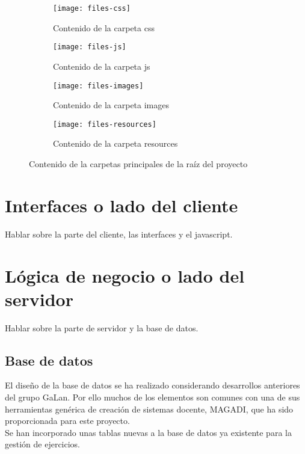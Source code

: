 \begin{figure}[h]
\begin{subfigure}[b]{0.5\textwidth}
	\texttt{[image: files-css]}
	\caption{Contenido de la carpeta css}
	\label{fig:files-css}
\end{subfigure}
%
\begin{subfigure}[b]{0.5\textwidth}
	\texttt{[image: files-js]}
	\caption{Contenido de la carpeta js}
	\label{fig:files-js}
\end{subfigure}
%
\begin{subfigure}[b]{0.5\textwidth}
	\texttt{[image: files-images]}
	\caption{Contenido de la carpeta images}
	\label{fig:files-images}
\end{subfigure}
%
\begin{subfigure}[b]{0.5\textwidth}
	\texttt{[image: files-resources]}
	\caption{Contenido de la carpeta resources}
	\label{fig:files-resources}
\end{subfigure}

\caption{Contenido de la carpetas principales de la raíz del proyecto}
\label{fig:files-2}
\end{figure}

\section{Interfaces o lado del cliente}
\label{diseno-e-implementacion:interfaces}

Hablar sobre la parte del cliente, las interfaces y el javascript.\\

\section{Lógica de negocio o lado del servidor}
\label{diseno-e-implementacion:logica-negocio}

Hablar sobre la parte de servidor y la base de datos.\\

\subsection{Base de datos}
\label{diseno-e-implementacion:logica-negocio:bd}

El diseño de la base de datos se ha realizado considerando desarrollos anteriores del grupo GaLan.
Por ello muchos de los elementos son comunes con una de sus herramientas genérica de creación
de sistemas docente, MAGADI, que ha sido proporcionada para este proyecto.\\

Se han incorporado unas tablas nuevas a la base de datos ya existente para la gestión de ejercicios.\\